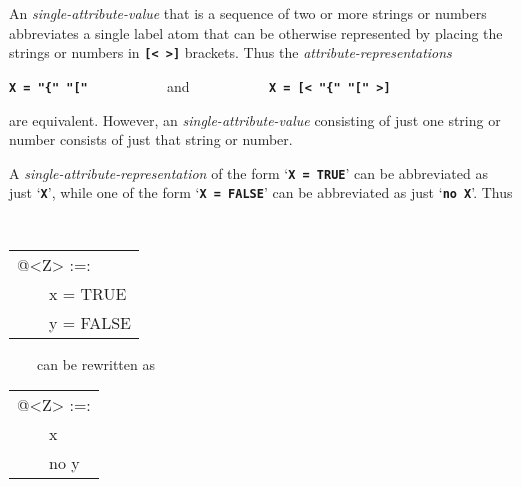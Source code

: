 \documentclass[12pt]{article}
\newcommand{\TT}[1]{{\tt \bfseries #1}}
\newenvironment{indpar}[1][0.3in]%
	{\begin{list}{}%
		     {\setlength{\itemsep}{0in}%
		      \setlength{\topsep}{0in}%
		      \setlength{\parsep}{1ex}%
		      \setlength{\labelwidth}{#1}%
		      \setlength{\leftmargin}{#1}%
		      \addtolength{\leftmargin}{\labelsep}}%
	 \item}%
	{\end{list}}
\begin{document}
An {\em single-attribute-value} that is a sequence
of two or more strings or numbers
abbreviates a single label atom that can be otherwise
represented by placing the strings or numbers in \TT{[<~>]} brackets.
Thus the {\em attribute-representations}
\begin{center}
\TT{X = "\{" "["} ~~~~~~~~~~ and ~~~~~~~~~~ \TT{X = [< "\{" "[" >]}
\end{center}
are equivalent.  However, an {\em single-attribute-value} consisting of just
one string or number consists of just that string or number.

A {\em single-attribute-representation} of the form `\TT{X = TRUE}'
can be abbreviated as just `\TT{X}', while one of the form
`\TT{X = FALSE}' can be abbreviated as just `\TT{no X}'.  Thus
\begin{indpar}
\tt
\begin{tabular}{l}
@<Z> :=: \\
~~~~x = TRUE \\
~~~~y = FALSE \\
\end{tabular}
~~~~{\rm can be rewritten as}~~~~
\begin{tabular}{l}
@<Z> :=: \\
~~~~x \\
~~~~no y \\
\end{tabular}
\end{indpar}
\end{document}

